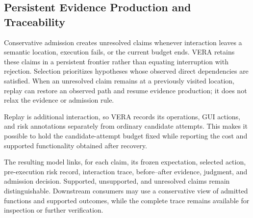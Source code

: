 \subsection{Persistent Evidence Production and Traceability}

Conservative admission creates unresolved claims whenever interaction leaves a
semantic location, execution fails, or the current budget ends. VERA retains
these claims in a persistent frontier rather than equating interruption with
rejection. Selection prioritizes hypotheses whose observed direct dependencies
are satisfied. When an unresolved claim remains at a previously visited
location, replay can restore an observed path and resume evidence production;
it does not relax the evidence or admission rule.

Replay is additional interaction, so VERA records its operations, GUI actions,
and risk annotations separately from ordinary candidate attempts. This makes it
possible to hold the candidate-attempt budget fixed while reporting the cost
and supported functionality obtained after recovery.

The resulting model links, for each claim, its frozen expectation, selected
action, pre-execution risk record, interaction trace, before--after evidence,
judgment, and admission decision. Supported, unsupported, and unresolved claims
remain distinguishable. Downstream consumers may use a conservative view of
admitted functions and supported outcomes, while the complete trace remains
available for inspection or further verification.
